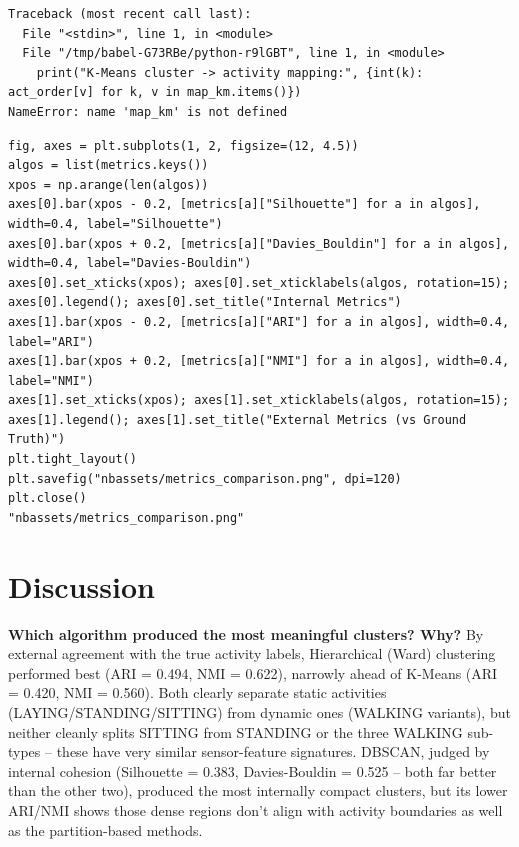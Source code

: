 \documentclass[12pt,a4paper]{article}
\begin{document}
\begin{verbatim}
Traceback (most recent call last):
  File "<stdin>", line 1, in <module>
  File "/tmp/babel-G73RBe/python-r9lGBT", line 1, in <module>
    print("K-Means cluster -> activity mapping:", {int(k): act_order[v] for k, v in map_km.items()})
NameError: name 'map_km' is not defined
\end{verbatim}


\begin{verbatim}
fig, axes = plt.subplots(1, 2, figsize=(12, 4.5))
algos = list(metrics.keys())
xpos = np.arange(len(algos))
axes[0].bar(xpos - 0.2, [metrics[a]["Silhouette"] for a in algos], width=0.4, label="Silhouette")
axes[0].bar(xpos + 0.2, [metrics[a]["Davies_Bouldin"] for a in algos], width=0.4, label="Davies-Bouldin")
axes[0].set_xticks(xpos); axes[0].set_xticklabels(algos, rotation=15); axes[0].legend(); axes[0].set_title("Internal Metrics")
axes[1].bar(xpos - 0.2, [metrics[a]["ARI"] for a in algos], width=0.4, label="ARI")
axes[1].bar(xpos + 0.2, [metrics[a]["NMI"] for a in algos], width=0.4, label="NMI")
axes[1].set_xticks(xpos); axes[1].set_xticklabels(algos, rotation=15); axes[1].legend(); axes[1].set_title("External Metrics (vs Ground Truth)")
plt.tight_layout()
plt.savefig("nbassets/metrics_comparison.png", dpi=120)
plt.close()
"nbassets/metrics_comparison.png"
\end{verbatim}

\url{}

\section{Discussion}
\label{sec:orgb3de067}

\textbf{Which algorithm produced the most meaningful clusters? Why?} By external
agreement with the true activity labels, Hierarchical (Ward) clustering
performed best (ARI = 0.494, NMI = 0.622), narrowly ahead of K-Means
(ARI = 0.420, NMI = 0.560). Both clearly separate static activities
(LAYING/STANDING/SITTING) from dynamic ones (WALKING variants), but
neither cleanly splits SITTING from STANDING or the three WALKING
sub-types -- these have very similar sensor-feature signatures. DBSCAN,
judged by internal cohesion (Silhouette = 0.383, Davies-Bouldin = 0.525 --
both far better than the other two), produced the most internally
compact clusters, but its lower ARI/NMI shows those dense regions don't
align with activity boundaries as well as the partition-based methods.
\end{document}
